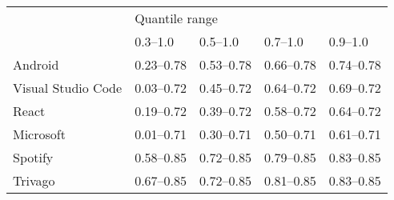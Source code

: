 \begin{tabular}{lllll}
\toprule
 & \multicolumn{4}{l}{Quantile range} \\
 & \numrange{0.3}{1.0} & \numrange{0.5}{1.0} & \numrange{0.7}{1.0} & \numrange{0.9}{1.0} \\
\midrule
Android & \numrange{0.23}{0.78} & \numrange{0.53}{0.78} & \numrange{0.66}{0.78} & \numrange{0.74}{0.78} \\
Visual Studio Code & \numrange{0.03}{0.72} & \numrange{0.45}{0.72} & \numrange{0.64}{0.72} & \numrange{0.69}{0.72} \\
React & \numrange{0.19}{0.72} & \numrange{0.39}{0.72} & \numrange{0.58}{0.72} & \numrange{0.64}{0.72} \\
Microsoft & \numrange{0.01}{0.71} & \numrange{0.30}{0.71} & \numrange{0.50}{0.71} & \numrange{0.61}{0.71} \\
Spotify & \numrange{0.58}{0.85} & \numrange{0.72}{0.85} & \numrange{0.79}{0.85} & \numrange{0.83}{0.85} \\
Trivago & \numrange{0.67}{0.85} & \numrange{0.72}{0.85} & \numrange{0.81}{0.85} & \numrange{0.83}{0.85} \\
\bottomrule
\end{tabular}
